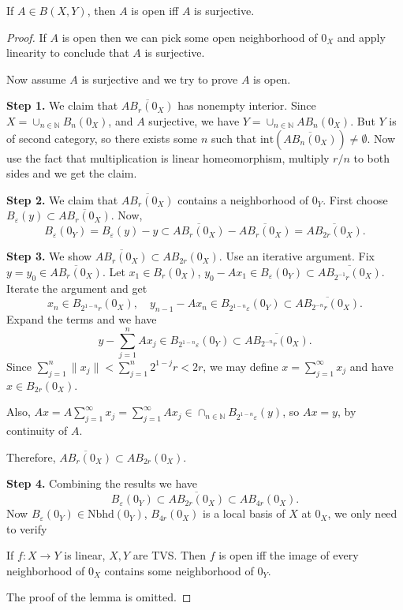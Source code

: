 \begin{theorem}
	\label{thm:OpenMappingThm}
	
	If $A \in B(X, Y)$, then $A $ is open iff $A$ is surjective.
\end{theorem}
\begin{proof}
	If $A$ is open then we can pick some open neighborhood of $0_X$ and apply linearity to conclude that $A$ is surjective. 

	Now assume $A$ is surjective and we try to prove $A$ is open.

	\textbf{Step 1.} We claim that $\overline{A B_r(0_X)} $ has nonempty interior. Since $X = \cup_{n \in \mathbb{N}} B_n(0_X)$, and $A$ surjective, we have $Y = \cup_{n \in \mathbb{N}} A B_n(0_X)$. But $Y$ is of second category, so there exists some $n$ such that $\text{int} (\overline{A B_n(0_X)}) \neq \emptyset $. Now use the fact that multiplication is linear homeomorphism, multiply $r / n$ to both sides and we get the claim.

	\textbf{Step 2.} We claim that $\overline{A B_r(0_X)} $ contains a neighborhood of $0_Y$. First choose $B_\varepsilon(y) \subset \overline{A B_r(0_X)} $. Now,
	\[
		B_\varepsilon(0_Y) = B_\varepsilon(y) - y \subset \overline{A B_r(0_X)} - \overline{A B_r(0_X)} = \overline{A B_{2 r}(0_X)}
	.\] 

	\textbf{Step 3.} We show $\overline{A B_{r}(0_X)} \subset A B_{2 r}(0_X)$. Use an iterative argument. Fix $y = y_0 \in \overline{A B_{r}(0_X)} $. Let $x_1 \in B_r(0_X)$, $y_0 - A x_1 \in B_\varepsilon(0_Y) \subset \overline{A B_{2^{-1}r}(0_X)} $. Iterate the argument and get
	\[
		x_n \in B_{2^{1 - n}r}(0_X), \quad
		y_{n - 1} - A x_n \in B_{2^{1 - n} \varepsilon}(0_Y)
		\subset \overline{A B_{2^{- n}r}(0_X)}
	.\] 
	Expand the terms and we have
	\[
		y - \sum_{j = 1}^n A x_j \in B_{2^{1 - n} \varepsilon}(0_Y)
		\subset \overline{A B_{2^{- n}r}(0_X)}
	.\] 
	Since $\sum_{j = 1}^n \|x_j\| < \sum_{j = 1}^n 2^{1 - j} r < 2 r$, we may define $x = \sum_{j = 1}^\infty x_j$ and have $x \in B_{2 r}(0_X)$.

	Also, $A x = A \sum_{j = 1}^\infty  x_j = \sum_{j = 1}^\infty  A x_j \in \cap_{n \in \mathbb{N}} B_{2^{1 - n}\varepsilon}(y)$, so $A x = y$, by continuity of $A$.

	Therefore, $\overline{A B_{r}(0_X)} \subset A B_{2 r}(0_X)$.


	\textbf{Step 4.} Combining the results we have
	\[
		B_\varepsilon(0_Y) \subset \overline{A B_{2r}(0_X)} \subset A B_{4 r}(0_X)
	.\] 
	Now $B_\varepsilon(0_Y) \in \text{Nbhd}(0_Y)$, $B_{4 r}(0_X)$ is a local basis of $X$ at $0_X$, we only need to verify

	\begin{lemma}
		If $f: X \to Y$ is linear, $X, Y$ are TVS. Then $f$ is open iff the image of every neighborhood of $0_X$ contains some neighborhood of $0_Y$.
	\end{lemma}
	The proof of the lemma is omitted.
\end{proof}

